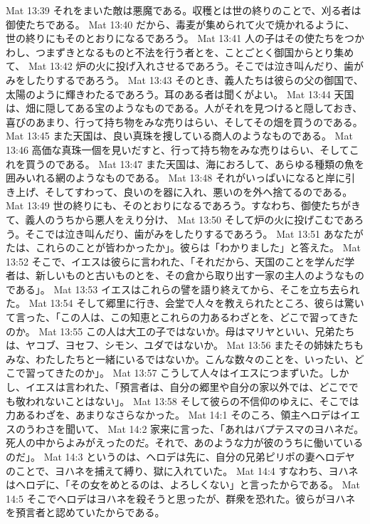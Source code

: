 Mat 13:39  それをまいた敵は悪魔である。収穫とは世の終りのことで、刈る者は御使たちである。
Mat 13:40  だから、毒麦が集められて火で焼かれるように、世の終りにもそのとおりになるであろう。
Mat 13:41  人の子はその使たちをつかわし、つまずきとなるものと不法を行う者とを、ことごとく御国からとり集めて、
Mat 13:42  炉の火に投げ入れさせるであろう。そこでは泣き叫んだり、歯がみをしたりするであろう。
Mat 13:43  そのとき、義人たちは彼らの父の御国で、太陽のように輝きわたるであろう。耳のある者は聞くがよい。
Mat 13:44  天国は、畑に隠してある宝のようなものである。人がそれを見つけると隠しておき、喜びのあまり、行って持ち物をみな売りはらい、そしてその畑を買うのである。
Mat 13:45  また天国は、良い真珠を捜している商人のようなものである。
Mat 13:46  高価な真珠一個を見いだすと、行って持ち物をみな売りはらい、そしてこれを買うのである。
Mat 13:47  また天国は、海におろして、あらゆる種類の魚を囲みいれる網のようなものである。
Mat 13:48  それがいっぱいになると岸に引き上げ、そしてすわって、良いのを器に入れ、悪いのを外へ捨てるのである。
Mat 13:49  世の終りにも、そのとおりになるであろう。すなわち、御使たちがきて、義人のうちから悪人をえり分け、
Mat 13:50  そして炉の火に投げこむであろう。そこでは泣き叫んだり、歯がみをしたりするであろう。
Mat 13:51  あなたがたは、これらのことが皆わかったか」。彼らは「わかりました」と答えた。
Mat 13:52  そこで、イエスは彼らに言われた、「それだから、天国のことを学んだ学者は、新しいものと古いものとを、その倉から取り出す一家の主人のようなものである」。
Mat 13:53  イエスはこれらの譬を語り終えてから、そこを立ち去られた。
Mat 13:54  そして郷里に行き、会堂で人々を教えられたところ、彼らは驚いて言った、「この人は、この知恵とこれらの力あるわざとを、どこで習ってきたのか。
Mat 13:55  この人は大工の子ではないか。母はマリヤといい、兄弟たちは、ヤコブ、ヨセフ、シモン、ユダではないか。
Mat 13:56  またその姉妹たちもみな、わたしたちと一緒にいるではないか。こんな数々のことを、いったい、どこで習ってきたのか」。
Mat 13:57  こうして人々はイエスにつまずいた。しかし、イエスは言われた、「預言者は、自分の郷里や自分の家以外では、どこででも敬われないことはない」。
Mat 13:58  そして彼らの不信仰のゆえに、そこでは力あるわざを、あまりなさらなかった。
Mat 14:1  そのころ、領主ヘロデはイエスのうわさを聞いて、
Mat 14:2  家来に言った、「あれはバプテスマのヨハネだ。死人の中からよみがえったのだ。それで、あのような力が彼のうちに働いているのだ」。
Mat 14:3  というのは、ヘロデは先に、自分の兄弟ピリポの妻ヘロデヤのことで、ヨハネを捕えて縛り、獄に入れていた。
Mat 14:4  すなわち、ヨハネはヘロデに、「その女をめとるのは、よろしくない」と言ったからである。
Mat 14:5  そこでヘロデはヨハネを殺そうと思ったが、群衆を恐れた。彼らがヨハネを預言者と認めていたからである。
